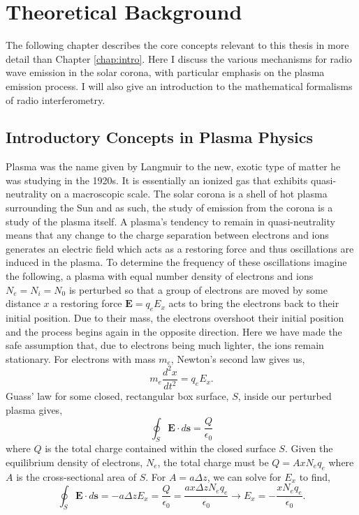 \doublespacing
\chapter{Theoretical Background}
\label{chap:theory}
The following chapter describes the core concepts relevant to this thesis in more detail than Chapter \ref{chap:intro}. Here I discuss the various mechanisms for radio wave emission in the solar corona, with particular emphasis on the plasma emission process. I will also give an introduction to the mathematical formalisms of radio interferometry.
\section{Introductory Concepts in Plasma Physics}
Plasma was the name given by Langmuir to the new, exotic type of matter he was studying in the 1920s. It is essentially an ionized gas that exhibits quasi-neutrality on a macroscopic scale. The solar corona is a shell of hot plasma surrounding the Sun and as such, the study of emission from the corona is a study of the plasma itself. A plasma's tendency to remain in quasi-neutrality means that any change to the charge separation between electrons and ions generates an electric field which acts as a restoring force and thus oscillations are induced in the plasma. To determine the frequency of these oscillations imagine the following, a plasma with equal number density of electrons and ions $N_e = N_i = N_0$ is perturbed so that a group of electrons are moved by some distance $x$ a restoring force $\mathbf{E} = q_e E_x$ acts to bring the electrons back to their initial position. Due to their mass, the electrons overshoot their initial position and the process begins again in the opposite direction. Here we have made the safe assumption that, due to electrons being much lighter, the ions remain stationary. For electrons with mass $m_e$, Newton's second law gives us,
\begin{equation}
\label{eq:fma}
m_e \frac{d^2x}{dt^2} = q_e E_x.
\end{equation}
Guass' law for some closed, rectangular box surface, $S$, inside our perturbed plasma gives, 
$$
\oint_S \mathbf{E} \cdot d\mathbf{s} = \frac{Q}{\epsilon_0}
$$
where $Q$ is the total charge contained within the closed surface $S$. Given the equilibrium density of electrons, $N_e$, the total charge must be $Q = A x N_e q_e$ where $A$ is the cross-sectional area of $S$. For $A=a\Delta z$, we can solve for  $E_x$ to find,
$$
\oint_S \mathbf{E} \cdot d\mathbf{s} = -a \Delta z E_x =  \frac{Q}{\epsilon_0} = \frac{ax\Delta z N_e q_e}{\epsilon_0} \rightarrow E_x = -\frac{x N_e q_e}{\epsilon_0}.
$$
